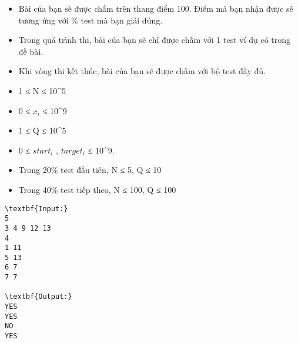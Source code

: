 \begin{itemize}
	\item Bài của bạn sẽ được chấm trên thang điểm 100. Điểm mà bạn nhận được sẽ tương ứng với \% test mà bạn giải đúng.
	\item Trong quá trình thi, bài của bạn sẽ chỉ được chấm với 1 test ví dụ có trong đề bài.
	\item Khi vòng thi kết thúc, bài của bạn sẽ được chấm với bộ test đầy đủ.
\end{itemize}
\begin{itemize}
	\item 1 ≤ N ≤ 10^5
	\item 0 ≤ $x_{i}$ ≤ 10^9
	\item 1 ≤ Q ≤ 10^5
	\item 0 ≤ $start_{i}$ , $target_{i}$ ≤ 10^9.
	\item Trong 20\% test đầu tiên, N ≤ 5, Q ≤ 10
	\item Trong 40\% test tiếp theo, N ≤ 100, Q ≤ 100
\end{itemize}
\begin{verbatim}
\textbf{Input:}
5
3 4 9 12 13
4
1 11
5 13
6 7
7 7

\textbf{Output:}
YES
YES
NO
YES
\end{verbatim}